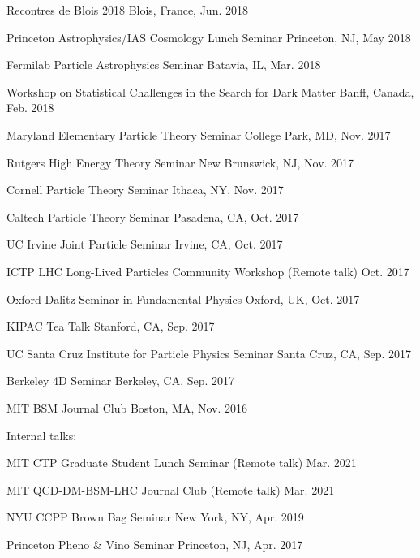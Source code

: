 \documentclass[11pt]{article}
\newenvironment{packed_itemize}{
\begin{itemize}[label=\raisebox{0.25ex}{\tiny$\bullet$}]
  \setlength{\itemsep}{3pt}
  \setlength{\parskip}{0pt}
  \setlength{\parsep}{0pt}}{\end{itemize}
}
\begin{document}
\begin{packed_itemize}
  \item Recontres de Blois 2018 \hfill Blois, France, Jun. 2018
  \item Princeton Astrophysics/IAS Cosmology Lunch Seminar \hfill Princeton, NJ, May 2018
  \item Fermilab Particle Astrophysics Seminar \hfill Batavia, IL, Mar. 2018
  \item Workshop on Statistical Challenges in the Search for Dark Matter \hfill Banff, Canada, Feb. 2018
  \item Maryland Elementary Particle Theory Seminar \hfill College Park, MD, Nov. 2017
  \item Rutgers High Energy Theory Seminar \hfill New Brunswick, NJ, Nov. 2017
  \item Cornell Particle Theory Seminar \hfill Ithaca, NY, Nov. 2017
  \item Caltech Particle Theory Seminar \hfill Pasadena, CA, Oct. 2017
  \item UC Irvine Joint Particle Seminar \hfill Irvine, CA, Oct. 2017
  \item ICTP LHC Long-Lived Particles Community Workshop (Remote talk) \hfill Oct. 2017
  \item Oxford Dalitz Seminar in Fundamental Physics  \hfill Oxford, UK, Oct. 2017
  \item KIPAC Tea Talk  \hfill Stanford, CA, Sep. 2017
  \item UC Santa Cruz Institute for Particle Physics Seminar  \hfill Santa Cruz, CA, Sep. 2017
  \item Berkeley 4D Seminar  \hfill Berkeley, CA, Sep. 2017
  \item MIT BSM Journal Club \hfill Boston, MA, Nov. 2016
\end{packed_itemize}

\noindent
Internal talks:
\begin{packed_itemize}
  \item MIT CTP Graduate Student Lunch Seminar (Remote talk) \hfill Mar. 2021
  \item MIT QCD-DM-BSM-LHC Journal Club (Remote talk) \hfill Mar. 2021
  \item NYU CCPP Brown Bag Seminar \hfill New York, NY, Apr. 2019
  \item Princeton Pheno \& Vino Seminar \hfill Princeton, NJ, Apr. 2017
\end{packed_itemize}
\newpage
\end{document}
